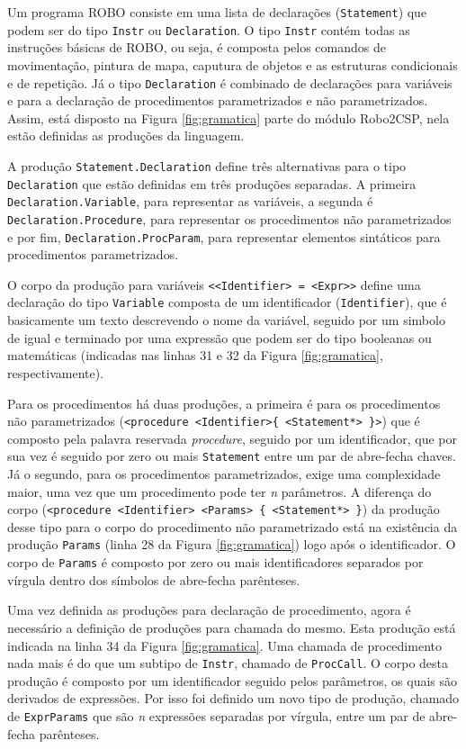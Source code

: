 Um programa ROBO consiste em uma lista de declarações (\texttt{Statement}) que podem ser do tipo \texttt{Instr} ou \texttt{Declaration}. O tipo \texttt{Instr} contém todas as instruções básicas de ROBO, ou seja, é composta pelos comandos de movimentação, pintura de mapa, caputura de objetos e as estruturas condicionais e de repetição. Já o tipo \texttt{Declaration} é combinado de declarações para variáveis e para a declaração de procedimentos parametrizados e não parametrizados. Assim, está disposto na Figura \ref{fig:gramatica} parte do módulo Robo2CSP, nela estão definidas as produções da linguagem.

A produção \texttt{Statement.Declaration} define três alternativas para o tipo \texttt{Declaration} que estão definidas em três produções separadas. A primeira \texttt{Declaration.Varia\-ble}, para representar as variáveis, a segunda é \texttt{Declaration.Procedure}, para representar os procedimentos não parametrizados e por fim, \texttt{Declaration.ProcParam}, para representar elementos sintáticos para procedimentos parametrizados.

O corpo da produção para variáveis \texttt{<<Identifier> = <Expr>>} define uma declaração do tipo \texttt{Variable} composta de um identificador (\texttt{Identifier}), que é basicamente um texto descrevendo o nome da variável, seguido por um simbolo de igual e terminado por uma expressão que podem ser do tipo booleanas ou matemáticas (indicadas nas linhas 31 e 32 da Figura \ref{fig:gramatica}, respectivamente).

Para os procedimentos há duas produções, a primeira é para os procedimentos não parametrizados (\texttt{<proce\-dure <Identifier>\{ <Statement*> \}>}) que é composto pela palavra reservada \textit{procedure}, seguido por um identificador, que por sua vez é seguido por zero ou mais \texttt{Statement} entre um par de abre-fecha chaves. Já o segundo, para os procedimentos parametrizados, exige uma complexidade maior, uma vez que um procedimento pode ter \textit{n} parâmetros. A diferença do corpo (\texttt{<procedure <Identifier> <Params> \{ <Statement*> \}}) da produção desse tipo para o corpo do procedimento não parametrizado está na existência da produção \texttt{Params} (linha 28 da Figura \ref{fig:gramatica}) logo após o identificador. O corpo de \texttt{Params} é composto por zero ou mais identificadores separados por vírgula dentro dos símbolos de abre-fecha parênteses.

Uma vez definida as produções para declaração de procedimento, agora é necessário a definição de produções para chamada do mesmo. Esta produção está indicada na linha 34 da Figura \ref{fig:gramatica}. Uma chamada de procedimento nada mais é do que um subtipo de \texttt{Instr}, chamado de \texttt{ProcCall}. O corpo desta produção é composto por um identificador seguido pelos parâmetros, os quais são derivados de expressões. Por isso foi definido um novo tipo de produção, chamado de \texttt{ExprParams} que são \textit{n} expressões separadas por vírgula, entre um par de abre-fecha parênteses.

